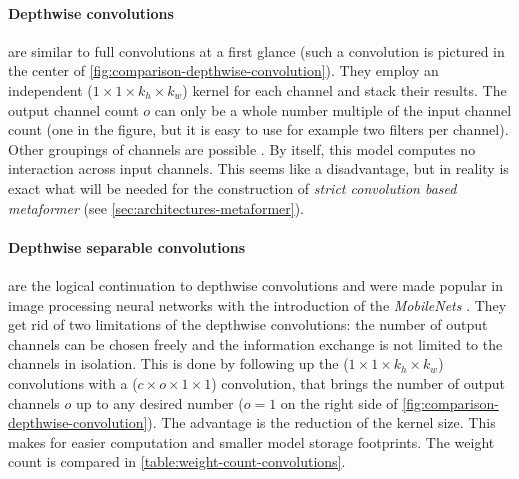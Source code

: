 \paragraph{Depthwise convolutions} are similar to full convolutions at a first glance (such a convolution is pictured in the center of \autoref{fig:comparison-depthwise-convolution}).
They employ an independent ($1\times 1 \times k_h \times k_w$) kernel for each channel and stack their results.
The output channel count $o$ can only be a whole number multiple of the input channel count (one in the figure, but it is easy to use for example two filters per channel).
Other groupings of channels are possible \cite{channelNets}.
By itself, this model computes no interaction across input channels. 
This seems like a disadvantage, but in reality is exact what will be needed for the construction of \emph{strict convolution based metaformer} (see \autoref{sec:architectures-metaformer}).

\paragraph{Depthwise separable convolutions} are the logical continuation to depthwise convolutions and were made popular in image processing neural networks with the introduction of the \emph{MobileNets} \cite{mobileNetPaper}.
They get rid of two limitations of the depthwise convolutions: the number of output channels can be chosen freely and the information exchange is not limited to the channels in isolation.
This is done by following up the ($1\times 1 \times k_h \times k_w$) convolutions with a ($c \times o \times 1 \times 1$) convolution, that brings the number of output channels $o$ up to any desired number ($o =1$ on the right side of \autoref{fig:comparison-depthwise-convolution}).
The advantage is the reduction of the kernel size. This makes for easier computation and smaller model storage footprints. 
The weight count is compared in \autoref{table:weight-count-convolutions}.

